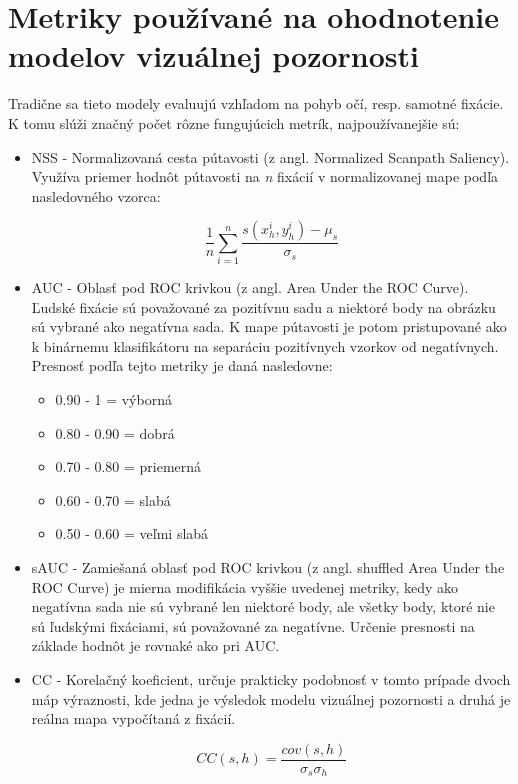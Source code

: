 \section{Metriky používané na ohodnotenie modelov vizuálnej pozornosti}
\label{metric}
Tradične sa tieto modely evaluujú vzhľadom na pohyb očí, resp. samotné fixácie. K tomu slúži značný počet rôzne fungujúcich metrík\cite{metriky}, najpoužívanejšie sú:

\begin{itemize}
	
	\item NSS - Normalizovaná cesta pútavosti (z angl. Normalized Scanpath Saliency). Využíva priemer hodnôt pútavosti na \textit{n} fixácií v normalizovanej mape podľa nasledovného vzorca: 
	
	\begin{equation}
	\frac{1}{n} \sum_{i=1}^{n} \frac{s(x_{h}^{i}, y_{h}^{i}) - \mu_{s}}{\sigma _{s}}
	\end{equation}
	
	\item AUC - Oblasť pod ROC krivkou (z angl. Area Under the ROC Curve).
	Ľudské fixácie sú považované za pozitívnu sadu a niektoré body na obrázku sú vybrané ako negatívna sada. K mape pútavosti je potom pristupované ako k binárnemu klasifikátoru na separáciu pozitívnych vzorkov od negatívnych. Presnosť podľa tejto metriky je daná nasledovne: 
	
	\begin{itemize}
		
		\item 0.90 - 1 = výborná
		\item 0.80 - 0.90 = dobrá
		\item 0.70 - 0.80 = priemerná
		\item 0.60 - 0.70 = slabá
		\item 0.50 - 0.60 = veľmi slabá
		
	\end{itemize}
	
	\item sAUC - Zamiešaná oblasť pod ROC krivkou (z angl. shuffled Area Under the ROC Curve) je mierna modifikácia vyššie uvedenej metriky, kedy ako negatívna sada nie sú vybrané len niektoré body, ale všetky body, ktoré nie sú ľudskými fixáciami, sú považované za negatívne. Určenie presnosti na základe hodnôt je rovnaké ako pri AUC. 
	
	\item CC - Korelačný koeficient, určuje prakticky podobnosť v tomto prípade dvoch máp výraznosti, kde jedna je výsledok modelu vizuálnej pozornosti a druhá je reálna mapa vypočítaná z fixácií. 
	
	\begin{equation}
	CC (s, h) = \frac{cov(s, h)}{\sigma_{s} \sigma _{h}}
	\end{equation}
\end{itemize}
 
